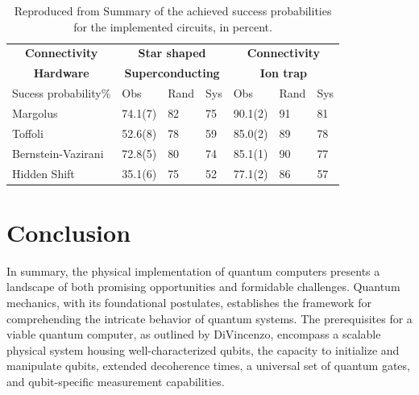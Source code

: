 \documentclass[
  journal=largetwo,
  year=2023,
]{cup-journal}
\begin{document}
\begin{table}[]
  \begin{tabular}{lllllll}
    \multicolumn{1}{c}{\textbf{Connectivity}} & \multicolumn{3}{c}{\textbf{Star shaped}}     & \multicolumn{3}{c}{\textbf{Connectivity}}                              \\
    \multicolumn{1}{c}{\textbf{Hardware}}     & \multicolumn{3}{c}{\textbf{Superconducting}} & \multicolumn{3}{c}{\textbf{Ion trap}}                                  \\
    Sucess probability\%                      & Obs                                          & Rand                                      & Sys & Obs     & Rand & Sys \\
    Margolus                                  & 74.1(7)                                      & 82                                        & 75  & 90.1(2) & 91   & 81  \\
    Toffoli                                   & 52.6(8)                                      & 78                                        & 59  & 85.0(2) & 89   & 78  \\
    Bernstein-Vazirani                        & 72.8(5)                                      & 80                                        & 74  & 85.1(1) & 90   & 77  \\
    Hidden Shift                              & 35.1(6)                                      & 75                                        & 52  & 77.1(2) & 86   & 57  \\
  \end{tabular}
  \caption{
    Reproduced from \autocite[6]{linke_2017_experimental} Summary of the achieved success probabilities for
    the implemented circuits, in percent.
  }
\end{table}

\section{Conclusion}

In summary, the physical implementation of quantum computers presents a landscape of both promising opportunities and formidable challenges. Quantum mechanics, with its foundational postulates, establishes the framework for comprehending the intricate behavior of quantum systems. The prerequisites for a viable quantum computer, as outlined by DiVincenzo, encompass a scalable physical system housing well-characterized qubits, the capacity to initialize and manipulate qubits, extended decoherence times, a universal set of quantum gates, and qubit-specific measurement capabilities.
\end{document}

